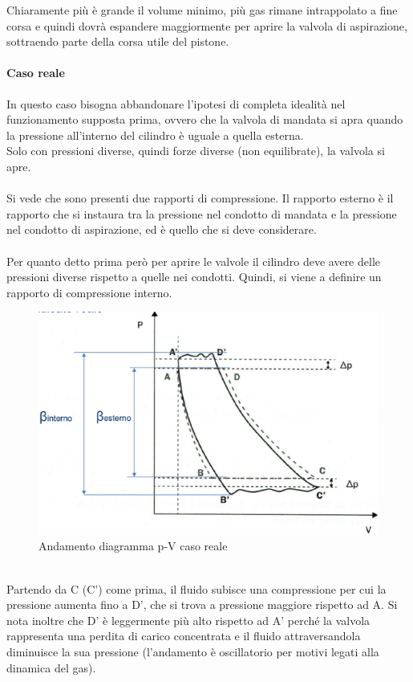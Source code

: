 Chiaramente più è grande il volume minimo, più gas rimane intrappolato a fine corsa e quindi dovrà espandere maggiormente per aprire la valvola di aspirazione, sottraendo parte della corsa utile del pistone.
\paragraph{Caso reale}
In questo caso bisogna abbandonare l'ipotesi di completa idealità nel funzionamento supposta prima, ovvero che la valvola di mandata si apra quando la pressione all’interno del cilindro è uguale a quella esterna. \\
Solo con pressioni diverse, quindi forze diverse (non equilibrate), la valvola si apre. \\
\\
Si vede che sono presenti due rapporti di compressione. Il rapporto esterno è il rapporto che si instaura tra la pressione nel condotto di mandata e la pressione nel condotto di aspirazione, ed è quello che si deve considerare.\\ 
\\
Per quanto detto prima però per aprire le valvole il cilindro deve avere delle pressioni diverse rispetto a quelle nei condotti. Quindi, si viene a definire un rapporto di compressione interno.
\begin{figure}[h]
    \centering
    \includegraphics{Immagini/CasoReale.png}
    \caption{Andamento diagramma p-V caso reale}
    \label{fig:CasoReale}
\end{figure}
\\
Partendo da C (C’) come prima, il fluido subisce una compressione per cui la pressione aumenta fino a D’, che si trova a pressione maggiore rispetto ad A. Si nota inoltre che D’ è leggermente più alto rispetto ad A’ perché la valvola rappresenta una perdita di carico concentrata e il fluido attraversandola diminuisce la sua pressione (l’andamento è oscillatorio per motivi legati alla dinamica del gas). \\
